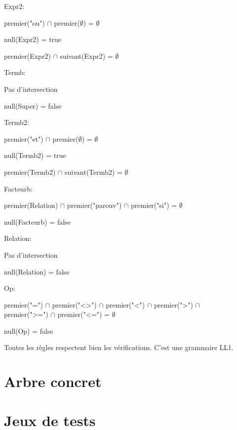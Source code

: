 \documentclass[a4paper,12pt]{article}
\begin{document}
  \medskip

\noindent Expr2:

   premier("ou") $\cap$ premier($\emptyset$) = $\emptyset$

   null(Expr2) = true

   premier(Expr2) $\cap$ suivant(Expr2) = $\emptyset$

\medskip

\noindent Termb:

   Pas d'intersection

   null(Super) = false

\medskip

\noindent Termb2:

   premier("et") $\cap$ premier($\emptyset$) = $\emptyset$

   null(Termb2) = true

   premier(Termb2) $\cap$ suivant(Termb2) = $\emptyset$

\medskip

\noindent Facteurb:

   premier(Relation) $\cap$ premier("parouv") $\cap$ premier("si") = $\emptyset$

   null(Facteurb) = false

\medskip

\noindent Relation:

   Pas d'intersection

   null(Relation) = false

\medskip

\noindent Op:

   premier("=") $\cap$ premier("<>") $\cap$ premier("<") $\cap$ premier(">") $\cap$ \\ premier(">=") $\cap$ premier("<=") = $\emptyset$

   null(Op) = false

\medskip

\noindent Toutes les règles respectent bien les vérifications. C'est une grammaire LL1.

\section{Arbre concret}


\medskip


\section{Jeux de tests}
\end{document}
